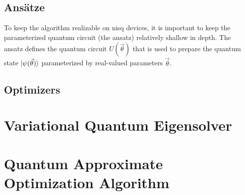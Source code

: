 \subsection{Ans{\"a}tze}
To keep the algorithm realizable on \gls{nisq} devices, it is important to keep the parameterized quantum circuit (the ansatz) relatively shallow in depth.
The ansatz defines the quantum circuit $U(\vec{\theta})$ that is used to prepare the quantum state $\vert{\psi(\vec{\theta})}\rangle$ parameterized by real-valued parameters $\vec{\theta}$.

\subsection{Optimizers}


\section{Variational Quantum Eigensolver}

\section{Quantum Approximate Optimization Algorithm}